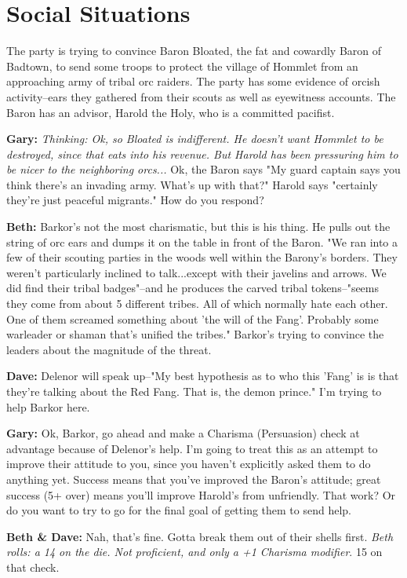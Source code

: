 \section{Social Situations}\label{example:social-situations}
The party is trying to convince Baron Bloated, the fat and cowardly Baron of Badtown, to send some troops to protect the village of Hommlet from an approaching army of tribal orc raiders. The party has some evidence of orcish activity--ears they gathered from their scouts as well as eyewitness accounts. The Baron has an advisor, Harold the Holy, who is a committed pacifist.

\textbf{Gary:} \textit{Thinking: Ok, so Bloated is indifferent. He doesn't want Hommlet to be destroyed, since that eats into his revenue. But Harold has been pressuring him to be nicer to the neighboring orcs...} Ok, the Baron says "My guard captain says you think there's an invading army. What's up with that?" Harold says "certainly they're just peaceful migrants." How do you respond?

\textbf{Beth:} Barkor's not the most charismatic, but this is his thing. He pulls out the string of orc ears and dumps it on the table in front of the Baron. "We ran into a few of their scouting parties in the woods well within the Barony's borders. They weren't particularly inclined to talk...except with their javelins and arrows. We did find their tribal badges"--and he produces the carved tribal tokens--"seems they come from about 5 different tribes. All of which normally hate each other. One of them screamed something about 'the will of the Fang'. Probably some warleader or shaman that's unified the tribes." Barkor's trying to convince the leaders about the magnitude of the threat.

\textbf{Dave:} Delenor will speak up--"My best hypothesis as to who this 'Fang' is is that they're talking about the Red Fang. That is, the demon prince." I'm trying to help Barkor here.

\textbf{Gary:} Ok, Barkor, go ahead and make a Charisma (Persuasion) check at advantage because of Delenor's help. I'm going to treat this as an attempt to improve their attitude to you, since you haven't explicitly asked them to do anything yet. Success means that you've improved the Baron's attitude; great success (5+ over) means you'll improve Harold's from unfriendly. That work? Or do you want to try to go for the final goal of getting them to send help.

\textbf{Beth \& Dave:} Nah, that's fine. Gotta break them out of their shells first. \textit{Beth rolls: a 14 on the die. Not proficient, and only a +1 Charisma modifier}. 15 on that check.

